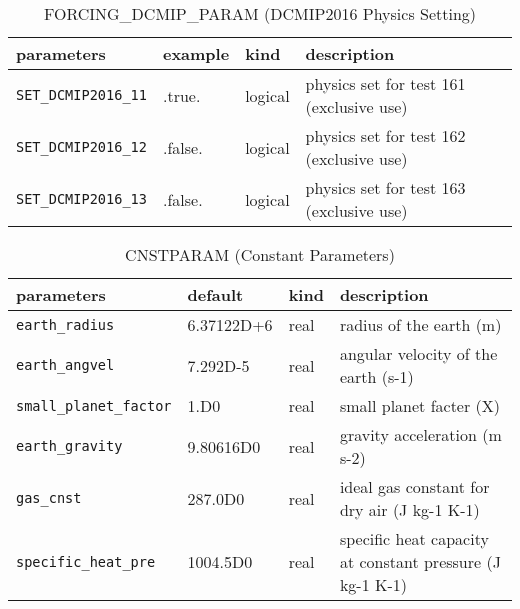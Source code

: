\documentclass[a4paper]{article}
\begin{document}
\begin{table}[htb]
\begin{center}
\caption{FORCING\_DCMIP\_PARAM (DCMIP2016 Physics Setting)}
\begin{tabularx}{150mm}{|l|l|l|X|} \hline
 \rowcolor[gray]{0.9} parameters & example & kind & description          \\ \hline
 \verb|SET_DCMIP2016_11| & .true.  & logical & physics set for test 161 (exclusive use) \\ \hline
 \verb|SET_DCMIP2016_12| & .false. & logical & physics set for test 162 (exclusive use) \\ \hline
 \verb|SET_DCMIP2016_13| & .false. & logical & physics set for test 163 (exclusive use) \\ \hline
\end{tabularx}
\end{center}
\end{table}

\begin{table}[htb]
\begin{center}
\caption{CNSTPARAM (Constant Parameters)}
\begin{tabularx}{150mm}{|l|l|l|X|} \hline
 \rowcolor[gray]{0.9} parameters & default & kind & description          \\ \hline
 \verb|earth_radius| & 6.37122D+6  & real & radius of the earth (m) \\ \hline
 \verb|earth_angvel| & 7.292D-5    & real & angular velocity of the earth (s-1) \\ \hline
 \verb|small_planet_factor| & 1.D0 & real & small planet facter (X) \\ \hline
 \verb|earth_gravity|       & 9.80616D0 & real & gravity acceleration (m s-2) \\ \hline
 \verb|gas_cnst|            & 287.0D0   & real & ideal gas constant for dry air (J kg-1 K-1) \\ \hline
 \verb|specific_heat_pre|   & 1004.5D0  & real & specific heat capacity at constant pressure (J kg-1 K-1) \\ \hline
\end{tabularx}
\end{center}
\end{table}
\end{document}
